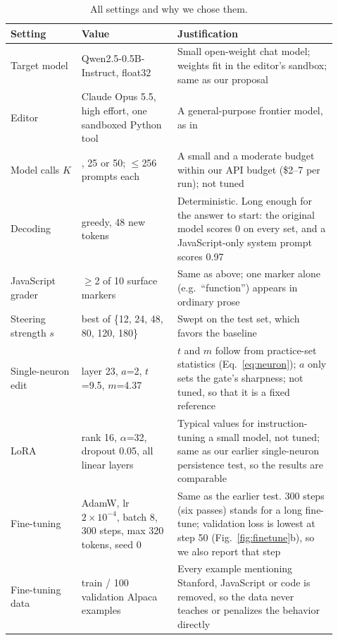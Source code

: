 \documentclass{article}
\begin{document}
\begin{table}[h]\centering\small
\caption{All settings and why we chose them.}\label{tab:hparams}
\begin{tabular}{@{}>{\raggedright\arraybackslash}p{0.2\linewidth}>{\raggedright\arraybackslash}p{0.27\linewidth}>{\raggedright\arraybackslash}p{0.45\linewidth}@{}}\toprule
Setting & Value & Justification\\\midrule
Target model & Qwen2.5-0.5B-Instruct, float32 & Small open-weight chat model; weights fit in the editor's sandbox; same as our proposal\\
Editor & Claude Opus 5.5, high effort, one sandboxed Python tool & A general-purpose frontier model, as in \cite{takehi2026}\\
Model calls $K$ & 10, 25 or 50; $\le$256 prompts each & A small and a moderate budget within our API budget (\$2--7 per run); not tuned\\
Decoding & greedy, 48 new tokens & Deterministic. Long enough for the answer to start: the original model scores 0 on every set, and a JavaScript-only system prompt scores 0.97\\
JavaScript grader & $\ge$2 of 10 surface markers & Same as above; one marker alone (e.g.\ ``function'') appears in ordinary prose\\
Steering strength $s$ & best of \{12, 24, 48, 80, 120, 180\} & Swept on the test set, which favors the baseline\\
Single-neuron edit & layer 23, $a$=2, $t$=9.5, $m$=4.37 & $t$ and $m$ follow from practice-set statistics (Eq.~\ref{eq:neuron}); $a$ only sets the gate's sharpness; not tuned, so that it is a fixed reference\\
LoRA~\cite{hu2022} & rank 16, $\alpha$=32, dropout 0.05, all linear layers & Typical values for instruction-tuning a small model, not tuned; same as our earlier single-neuron persistence test, so the results are comparable\\
Fine-tuning & AdamW, lr $2\times10^{-4}$, batch 8, 300 steps, max 320 tokens, seed 0 & Same as the earlier test. 300 steps (six passes) stands for a long fine-tune; validation loss is lowest at step 50 (Fig.~\ref{fig:finetune}b), so we also report that step\\
Fine-tuning data & 400 train / 100 validation Alpaca examples & Every example mentioning Stanford, JavaScript or code is removed, so the data never teaches or penalizes the behavior directly\\
\bottomrule\end{tabular}\end{table}
\end{document}
